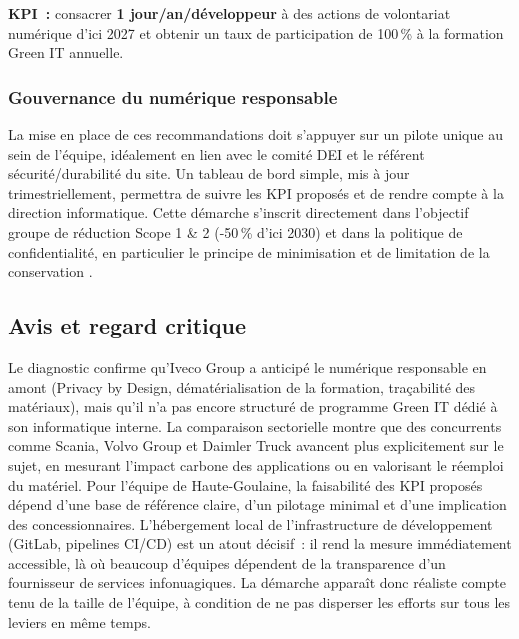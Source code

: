 \textbf{KPI~:} consacrer \textbf{1 jour/an/développeur} à des actions de volontariat numérique d'ici 2027 et obtenir un taux de participation de 100\,\% à la formation Green IT annuelle.

\subsubsection*{Gouvernance du numérique responsable}

La mise en place de ces recommandations doit s'appuyer sur un pilote unique au sein de l'équipe, idéalement en lien avec le comité DEI et le référent sécurité/durabilité du site. Un tableau de bord simple, mis à jour trimestriellement, permettra de suivre les KPI proposés et de rendre compte à la direction informatique. Cette démarche s'inscrit directement dans l'objectif groupe de réduction Scope 1 \& 2 (-50\,\% d'ici 2030) et dans la politique de confidentialité, en particulier le principe de minimisation et de limitation de la conservation \cite{iveco_privacy_2025}.

\subsection*{Avis et regard critique}

Le diagnostic confirme qu'Iveco Group a anticipé le numérique responsable en amont (Privacy by Design, dématérialisation de la formation, traçabilité des matériaux), mais qu'il n'a pas encore structuré de programme Green IT dédié à son informatique interne. La comparaison sectorielle montre que des concurrents comme Scania, Volvo Group et Daimler Truck avancent plus explicitement sur le sujet, en mesurant l'impact carbone des applications ou en valorisant le réemploi du matériel. Pour l'équipe de Haute-Goulaine, la faisabilité des KPI proposés dépend d'une base de référence claire, d'un pilotage minimal et d'une implication des concessionnaires. L'hébergement local de l'infrastructure de développement (GitLab, pipelines CI/CD) est un atout décisif~: il rend la mesure immédiatement accessible, là où beaucoup d'équipes dépendent de la transparence d'un fournisseur de services infonuagiques. La démarche apparaît donc réaliste compte tenu de la taille de l'équipe, à condition de ne pas disperser les efforts sur tous les leviers en même temps.
